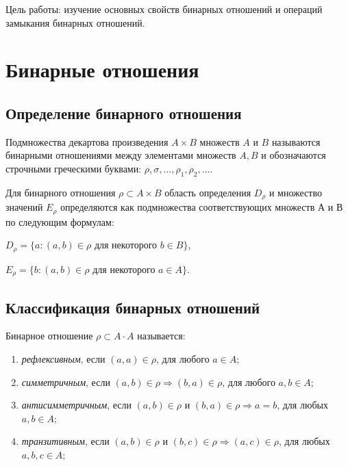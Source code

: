\documentclass[bachelor, och, labwork]{shiza}
\begin{document}
	
	
	\tableofcontents
	
	\newpage
	
	Цель работы: изучение основных свойств бинарных отношений и операций замыкания бинарных отношений.
	
	\section{Бинарные отношения}
	    \subsection{Определение бинарного отношения}
	
	Подмножества декартова произведения $A \times B$ множеств $A$ и $B$ называются бинарными отношениями между элементами множеств $A, B$ и обозначаются строчными греческими буквами: 
	$\rho,\sigma, ..., \rho_1, \rho_2, ...   $.
	
	Для бинарного отношения $\rho \subset A \times B$ область определения $D_\rho$ и множество значений $E_\rho$ определяются как подмножества соответствующих множеств $А$ и $В$ по следующим формулам:
	
	 $D_\rho = \{a: (a,b) \in \rho $ для некоторого $ b \in B \}$,
	 
	 
	 $E_\rho = \{b: (a,b) \in \rho $ для некоторого $ a \in A \}$. 
	

    \subsection{Классификация бинарных отношений}

	Бинарное отношение $\rho \subset A \cdot A$ называется:

	\begin{enumerate}
		\item \textit{рефлексивным}, если $(a, a) \in \rho$, для любого $a \in A$;
		\item \textit{симметричным}, если $(a, b) \in \rho \Rightarrow (b, a) \in \rho$, для любого $a, b \in A$;
		\item \textit{антисимметричным}, если $(a, b) \in \rho \text{ и } (b, a) \in \rho \Rightarrow a = b$, для любых $a, b \in A$;
		\item \textit{транзитивным}, если $(a, b) \in \rho \text{ и } (b, c) \in \rho \Rightarrow (a, c) \in \rho$, для любых $a, b, c \in A$;
	\end{enumerate}
	
\end{document}
